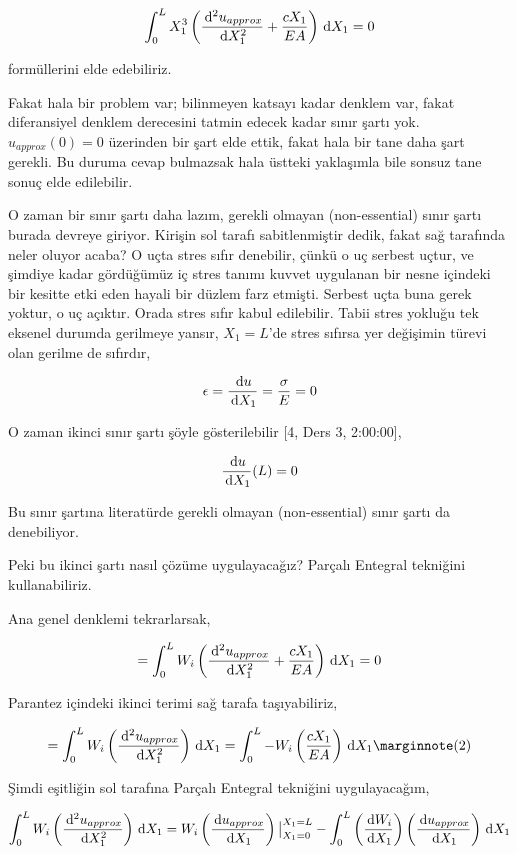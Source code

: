 \documentclass[12pt,fleqn]{article}\usepackage{../../common}
\begin{document}
$$
\int_{0}^{L} X_1^3 \left( \frac{\,\mathrm{d}^2 u_{approx}}{\,\mathrm{d} X_1^2} + \frac{c X_1}{EA}  \right) \,\mathrm{d} X_1 = 0
$$

formüllerini elde edebiliriz.

Fakat hala bir problem var; bilinmeyen katsayı kadar denklem var, fakat
diferansiyel denklem derecesini tatmin edecek kadar sınır şartı
yok. $u_{approx}(0)=0$ üzerinden bir şart elde ettik, fakat hala bir tane
daha şart gerekli. Bu duruma cevap bulmazsak hala üstteki yaklaşımla bile
sonsuz tane sonuç elde edilebilir.

O zaman bir sınır şartı daha lazım, gerekli olmayan (non-essential) sınır şartı
burada devreye giriyor. Kirişin sol tarafı sabitlenmiştir dedik, fakat sağ
tarafında neler oluyor acaba? O uçta stres sıfır denebilir, çünkü o uç serbest
uçtur, ve şimdiye kadar gördüğümüz iç stres tanımı kuvvet uygulanan bir nesne
içindeki bir kesitte etki eden hayali bir düzlem farz etmişti. Serbest uçta buna
gerek yoktur, o uç açıktır. Orada stres sıfır kabul edilebilir. Tabii stres
yokluğu tek eksenel durumda gerilmeye yansır, $X_1=L$'de stres sıfırsa yer
değişimin türevi olan gerilme de sıfırdır,

$$
\epsilon = \frac{\,\mathrm{d} u}{\,\mathrm{d} X_1} = \frac{\sigma}{E} = 0
$$

O zaman ikinci sınır şartı şöyle gösterilebilir [4, Ders 3, 2:00:00],

$$
\frac{\,\mathrm{d} u}{\,\mathrm{d} X_1}(L) = 0 
$$

Bu sınır şartına literatürde gerekli olmayan (non-essential) sınır şartı da
denebiliyor.

Peki bu ikinci şartı nasıl çözüme uygulayacağız? Parçalı Entegral tekniğini
kullanabiliriz.

Ana genel denklemi tekrarlarsak,

$$
= \int_{0}^{L} W_i \left(
  \frac{\,\mathrm{d}^2 u_{approx}}{\,\mathrm{d} X_1^2} + \frac{c X_1}{EA}
\right) \,\mathrm{d} X_1 = 0
$$

Parantez içindeki ikinci terimi sağ tarafa taşıyabiliriz,

$$
= \int_{0}^{L} W_i \left( \frac{\ud^2 u_{approx}}{\ud X_1^2} \right) \ud X_1 =
\int_{0}^{L} - W_i  \left( \frac{c X_1}{EA} \right) \ud X_1
\mlabel{2}
$$

Şimdi eşitliğin sol tarafına Parçalı Entegral tekniğini uygulayacağım,

$$
\int_{0}^{L} W_i \left( \frac{\,\mathrm{d}^2 u_{approx}}{\,\mathrm{d} X_1^2} \right) \,\mathrm{d} X_1 =
W_i \left( \frac{\,\mathrm{d} u_{approx}}{\,\mathrm{d} X_1} \right) \big\vert_{X_1=0}^{X_1=L} -
\int_{0}^{L} \left( \frac{\,\mathrm{d} W_i}{\,\mathrm{d} X_1}  \right) \left( \frac{\,\mathrm{d} u_{approx}}{\,\mathrm{d} X_1}\right) \,\mathrm{d} X_1
$$
\end{document}
